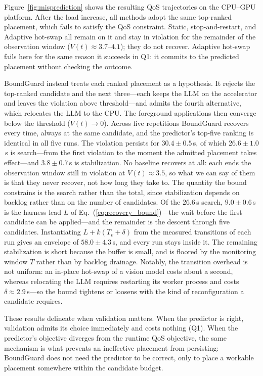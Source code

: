 \documentclass[conference]{IEEEtran}
\begin{document}
{{Figure~\ref{fig:misprediction} shows the resulting QoS trajectories on the CPU--GPU platform. After the load increase, all methods adopt the same top-ranked placement, which fails to satisfy the QoS constraint. Static, stop-and-restart, and Adaptive hot-swap all remain on it and stay in violation for the remainder of the observation window ($V(t)\approx3.7$--$4.1$); they do not recover. Adaptive hot-swap fails here for the same reason it succeeds in Q1: it commits to the predicted placement without checking the outcome.

BoundGuard instead treats each ranked placement as a hypothesis. It rejects the top-ranked candidate and the next three---each keeps the LLM on the accelerator and leaves the violation above threshold---and admits the fourth alternative, which relocates the LLM to the CPU. The foreground applications then converge below the threshold ($V(t)\to0$). Across five repetitions BoundGuard recovers every time, always at the same candidate, and the predictor's top-five ranking is identical in all five runs. The violation persists for $30.4\pm0.5$\,s, of which $26.6\pm1.0$\,s is search---from the first violation to the moment the admitted placement takes effect---and $3.8\pm0.7$\,s is stabilization. No baseline recovers at all: each ends the observation window still in violation at $V(t)\approx3.5$, so what we can say of them is that they never recover, not how long they take to. The quantity the bound constrains is the search rather than the total, since stabilization depends on backlog rather than on the number of candidates. Of the $26.6$\,s search, $9.0\pm0.6$\,s is the harness lead $L$ of Eq.~(\ref{eq:recovery_bound})---the wait before the first candidate can be applied---and the remainder is the descent through five candidates. Instantiating $L+k(T_v+\delta)$ from the measured transitions of each run gives an envelope of $58.0\pm4.3$\,s, and every run stays inside it. The remaining stabilization is short because the buffer is small, and is floored by the monitoring window $T$ rather than by backlog drainage. Notably, the transition overhead is not uniform: an in-place hot-swap of a vision model costs about a second, whereas relocating the LLM requires restarting its worker process and costs $\delta\approx2.9$\,s---so the bound tightens or loosens with the kind of reconfiguration a candidate requires.

These results delineate when validation matters. When the predictor is right, validation admits its choice immediately and costs nothing (Q1). When the predictor's objective diverges from the runtime QoS objective, the same mechanism is what prevents an ineffective placement from persisting: BoundGuard does not need the predictor to be correct, only to place a workable placement somewhere within the candidate budget.}

}
\end{document}
